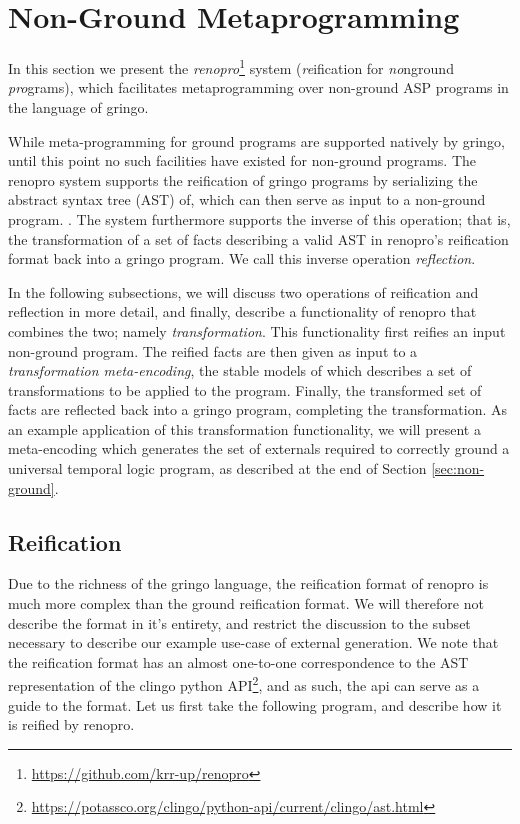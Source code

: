 \section{Non-Ground Metaprogramming}

In this section we present the
\emph{renopro}\footnote{\url{https://github.com/krr-up/renopro}}
system (\emph{re}ification for \emph{no}nground \emph{pro}grams), which
facilitates metaprogramming over non-ground ASP programs in the
language of gringo.

While meta-programming for ground programs are supported natively by
gringo, until this point no such facilities have existed for
non-ground programs. The renopro system supports the reification of
gringo programs by serializing the abstract syntax tree (AST) of,
which can then serve as input to a non-ground program. . The system
furthermore supports the inverse of this operation; that is, the
transformation of a set of facts describing a valid AST in renopro's
reification format back into a gringo program. We call this inverse
operation \emph{reflection}.

In the following subsections, we will discuss two operations of
reification and reflection in more detail, and finally, describe a
functionality of renopro that combines the two; namely
\emph{transformation}. This functionality first reifies an input
non-ground program. The reified facts are then given as input to a
\emph{transformation meta-encoding}, the stable models of which
describes a set of transformations to be applied to the
program. Finally, the transformed set of facts are reflected back into
a gringo program, completing the transformation. As an example
application of this transformation functionality, we will present a
meta-encoding which generates the set of externals required to
correctly ground a universal temporal logic program, as described at
the end of Section \ref{sec:non-ground}.

\subsection{Reification}

Due to the richness of the gringo language, the reification format of
renopro is much more complex than the ground reification format. We
will therefore not describe the format in it's entirety, and restrict
the discussion to the subset necessary to describe our example
use-case of external generation. We note that the reification format
has an almost one-to-one correspondence to the AST representation of
the clingo python
API\footnote{\url{https://potassco.org/clingo/python-api/current/clingo/ast.html}},
and as such, the api can serve as a guide to the format. Let us first
take the following program, and describe how it is reified by renopro.

